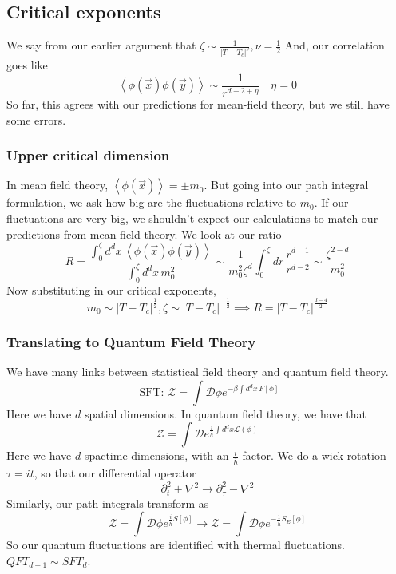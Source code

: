 \subsection{Critical exponents} 
We say from our earlier argument that $ \zeta \sim \frac{1}{ | T - T _ c |^ \nu } , \nu = \frac{1}{2 } $ And, our correlation goes like
\[
	\left< \phi ( \vec{x} ) \phi ( \vec{y} )  \right> \sim \frac{1}{ r^{ d - 2 + \eta }} \quad \eta  =0 
\] So far, this agrees with our predictions for mean-field theory, 
but we still have some errors. 

\subsubsection{Upper critical dimension} 
In mean field theory, $ \left< \phi ( \vec{x} )  \right> = \pm m_0 $. 
But going into our path integral formulation, 
we ask how big are the fluctuations relative to $ m_0 $. 
If our fluctuations are very big, we shouldn't
expect our calculations to match our 
predictions from mean field theory. 
We look at our ratio
\[
	R = \frac{\int _ 0 ^\zeta d^ d x \, \left< \phi ( \vec{x} ) \phi ( \vec{y} )   \right>  }{\int_0 ^ \zeta d^ d x \, m_0 ^ 2 } \sim \frac{1}{m_0 ^ 2 \zeta ^ d } \int_0 ^ \zeta dr \, \frac{ r^{ d- 1} }{r^{ d - 2 } } \sim \frac{ \zeta^{ 2 -d } }{m_0 ^ 2 }
\]  
Now substituting in our critical exponents, 
\[
 m_0 \sim | T - T_c |^{ \frac{1}{ 2 } }, \zeta \sim | T -T _c|^{- \frac{1}{2 } } \implies R = | T -T_c | ^{ \frac{ d - 4 }{ 2 } }
\]

\subsubsection{Translating to Quantum Field Theory} 
We have many links between statistical field theory and
quantum field theory. 
\[
	\text{ SFT:  } \mathcal{  Z} = \int \mathcal{ D } \phi e^{ - \beta \int d^ d x \, F [ \phi ] }
\]  Here we have $ d $ spatial dimensions. 
In quantum field theory, 
we have that 
\[
	\mathcal{ Z } = \int \mathcal{ D } e^{ \frac{i}{\overline{h} } \int d^ d x \mathcal{ L ( \phi ) }}
\] Here we have $ d $ spactime dimensions, with an $ \frac{i}{\overline{h} }$ factor. 
We do a wick rotation $ \tau = i t $, 
so that our differential operator 
 \[
 \partial  _ t^ 2 +  \nabla ^ 2 \to \partial _ \tau ^ 2 - \nabla ^ 2 
\] Similarly, our path integrals transform as 
\[
	\mathcal{ Z  } = \int \mathcal{ D } \phi e^{ \frac{i}{\overline{h} } S [ \phi ]  } \to \mathcal{ Z } = \int \mathcal{ D } \phi e ^{ - \frac{1}{\overline{h}  } S_{ E } [ \phi ] }
\] So our quantum fluctuations are identified with thermal fluctuations.
$QFT_{ d -1 } \sim SFT_d $. 
\pagebreak 

